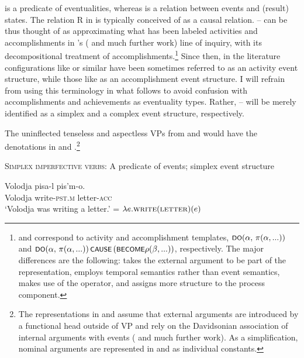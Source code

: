 \documentclass[output=paper,colorlinks,citecolor=brown]{langscibook}
\begin{document}
\noindent {} is a predicate of eventualities, whereas  is a relation between events and (result) states. The relation R in  is typically conceived of as a causal relation. -- can be thus thought of as approximating what has been labeled activities and accomplishments in \citeauthor{Dowty1979}'s (\citeyear{Dowty1979} and much further work) line of inquiry, with its decompositional treatment of accomplishments.\footnote{ and  correspond to  activity and accomplishment templates, $\cnst{do}(\alpha,\, \pi (\alpha,...))$ and $\cnst{do}(\alpha,\, \pi(\alpha,...))\, \cnst{cause}\, (\cnst{become} \rho (\beta,...))$, respectively. The major differences are the following: \citeauthor{Dowty1979} takes the external argument to be part of the representation, employs temporal semantics rather than event semantics, makes use of the  operator, and assigns more structure to the process component.}  Since then, in the literature  configurations like  or similar have been sometimes referred to as an activity event structure, while those like  as an accomplishment event structure. I will refrain from using this terminology in what follows to avoid confusion with accomplishments and achievements as eventuality types. Rather, -- will be merely identified as a simplex and a complex event structure, respectively.

The uninflected tenseless and aspectless VPs from  and  would have the denotations in  and .\footnote{The representations in  and  assume that external arguments are introduced by a functional head outside of VP and rely on the Davidsonian association of internal arguments with events (\citealt{Kratzer1996,Kratzer2003} and much further work). As a simplification, nominal arguments are represented in  and  as individual constants.}

\eanoraggedright   \textsc{Simplex imperfective verbs}: A predicate of events; simplex event structure\label{ex:tatevosov:33}

 \ea
 \gll Volodja  pisa-l  pis’m-o.\\
     Volodja  write-\textsc{pst.m}  letter-\textsc{acc}\\
\glt ‘Volodja was writing a letter.’\label{ex:tatevosov:33a}
 \ex
    = $\lambda e. \textsc{write}(\textsc{letter})(e)$\label{ex:tatevosov:33b}
 \z
\z
\end{document}
